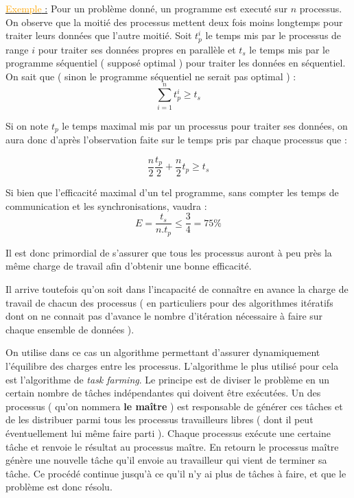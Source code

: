 \documentclass[fleqn,11pt]{article}
\begin{document}
\underline{\textcolor{orange}{Exemple} :} Pour un problème donné, un programme est executé sur $n$ processus. On observe que la moitié des processus
mettent deux fois moins longtemps pour traiter leurs données que l'autre moitié. Soit $t_{p}^{i}$ le temps mis par le processus de range $i$ pour traiter ses données
propres  en parallèle et $t_{s}$ le temps mis par le programme séquentiel ( supposé optimal ) pour traiter les données en séquentiel.
On sait que ( sinon le programme séquentiel ne serait pas optimal ) :
\[
 \sum_{i=1}^{n} t_{p}^{i} \geq t_{s}
\]

Si on note $t_{p}$ le temps maximal mis par un processus pour traiter ses données, on aura donc d'après l'observation faite sur le temps pris par chaque processus que :

\[
 \frac{n}{2}\frac{t_{p}}{2} + \frac{n}{2}t_{p} \geq t_{s}
\]

Si bien que l'efficacité maximal d'un tel programme, sans compter les temps de communication et les synchronisations,  vaudra :
\[
 E =  \frac{t_{s}}{n.t_{p}} \leq \frac{3}{4} = 75 \%
\]

Il est donc primordial de s'assurer que tous les processus auront à peu près la même charge de travail afin d'obtenir une bonne efficacité.

Il arrive toutefois qu'on soit dans l'incapacité de connaître en avance la charge de travail de chacun des processus ( en particuliers pour des
algorithmes itératifs dont on ne connait pas d'avance le nombre d'itération nécessaire à faire sur chaque ensemble de données ).

On utilise dans ce cas un algorithme permettant d'assurer dynamiquement l'équilibre des charges entre les processus. L'algorithme le plus utilisé
pour cela est l'algorithme de \textsl{task farming}. Le principe est de diviser le problème en un certain nombre de tâches indépendantes
qui doivent être exécutées. Un des processus ( qu'on nommera \textbf{le maître} ) est responsable de générer ces tâches et de les distribuer
parmi tous les processus travailleurs libres ( dont il peut éventuellement lui même faire parti ). Chaque processus exécute une certaine tâche et renvoie
le résultat au processus maître. En retourn le processus maître génère une nouvelle tâche qu'il envoie au travailleur qui vient de terminer
sa tâche. Ce procédé continue jusqu'à ce qu'il n'y ai plus de tâches à faire, et que le problème est donc résolu.
\end{document}

